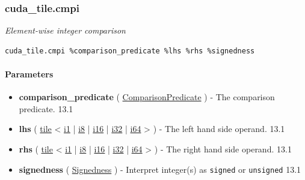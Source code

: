 \documentclass{article}
\begin{document}
\subsubsection{cuda\_tile.cmpi}

\textit{Element-wise integer comparison}


\begin{lstlisting}
cuda_tile.cmpi %comparison_predicate %lhs %rhs %signedness
\end{lstlisting}

\paragraph{Parameters}

\begin{itemize}
\item \textbf{comparison\_predicate} ( \href{https://docs.nvidia.com/cuda/tile-ir/latest/sections/operations.html#op-attribute-cuda-tile-cmpi-comparisonpredicate-attr}{ComparisonPredicate} ) - The comparison predicate. 13.1
\item \textbf{lhs} ( \href{https://docs.nvidia.com/cuda/tile-ir/latest/sections/types.html#type-tile}{tile} < \href{https://docs.nvidia.com/cuda/tile-ir/latest/sections/types.html#subsection-element-types}{i1} | \href{https://docs.nvidia.com/cuda/tile-ir/latest/sections/types.html#subsection-element-types}{i8} | \href{https://docs.nvidia.com/cuda/tile-ir/latest/sections/types.html#subsection-element-types}{i16} | \href{https://docs.nvidia.com/cuda/tile-ir/latest/sections/types.html#subsection-element-types}{i32} | \href{https://docs.nvidia.com/cuda/tile-ir/latest/sections/types.html#subsection-element-types}{i64} > ) - The left hand side operand. 13.1
\item \textbf{rhs} ( \href{https://docs.nvidia.com/cuda/tile-ir/latest/sections/types.html#type-tile}{tile} < \href{https://docs.nvidia.com/cuda/tile-ir/latest/sections/types.html#subsection-element-types}{i1} | \href{https://docs.nvidia.com/cuda/tile-ir/latest/sections/types.html#subsection-element-types}{i8} | \href{https://docs.nvidia.com/cuda/tile-ir/latest/sections/types.html#subsection-element-types}{i16} | \href{https://docs.nvidia.com/cuda/tile-ir/latest/sections/types.html#subsection-element-types}{i32} | \href{https://docs.nvidia.com/cuda/tile-ir/latest/sections/types.html#subsection-element-types}{i64} > ) - The right hand side operand. 13.1
\item \textbf{signedness} ( \href{https://docs.nvidia.com/cuda/tile-ir/latest/sections/operations.html#op-attribute-cuda-tile-cmpi-signedness-attr}{Signedness} ) - Interpret integer(s) as \texttt{signed} or \texttt{unsigned} 13.1



\end{itemize}
\end{document}
